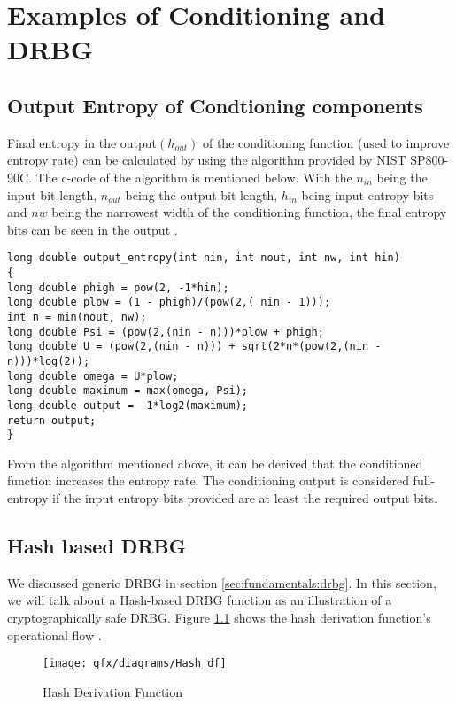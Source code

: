 \chapter{Examples of Conditioning and DRBG}\label{ch:classicthesis}
%
%
\section{Output Entropy of Condtioning components}
\label{A:1:1}
Final entropy in the output$(h_{out})$ of the conditioning function (used to improve entropy rate) can be calculated by using the algorithm provided by NIST SP800-90C. The c-code of the algorithm is mentioned below. With the $n_{in}$ being the input bit length, $n_{out}$ being the output bit length, $h_{in}$ being input entropy bits and $nw$ being the narrowest width of the conditioning function, the final entropy bits can be seen in the output \cite{SP90B-2018}.

\begin{lstlisting}
long double output_entropy(int nin, int nout, int nw, int hin)
{
long double phigh = pow(2, -1*hin);
long double plow = (1 - phigh)/(pow(2,( nin - 1)));
int n = min(nout, nw);
long double Psi = (pow(2,(nin - n)))*plow + phigh;
long double U = (pow(2,(nin - n))) + sqrt(2*n*(pow(2,(nin - n)))*log(2));
long double omega = U*plow;
long double maximum = max(omega, Psi);
long double output = -1*log2(maximum);
return output;
}

\end{lstlisting}

From the algorithm mentioned above, it can be derived that the conditioned function increases the entropy rate. The conditioning output is considered full-entropy if the input entropy bits provided are at least the required output bits.

\section{Hash based DRBG}
\label{A:1:2}
We discussed generic DRBG in section \ref{sec:fundamentals:drbg}. In this section, we will talk about a Hash-based DRBG function as an illustration of a cryptographically safe DRBG. Figure \ref{fig:2:16} shows the hash derivation function's operational flow \cite{SP90A-2015}.

\begin{figure}[htbp]
	\centering
	\texttt{[image: gfx/diagrams/Hash\_df]}
	\caption{Hash Derivation Function \cite{SP90A-2015}}
	\label{fig:2:16}
\end{figure}

